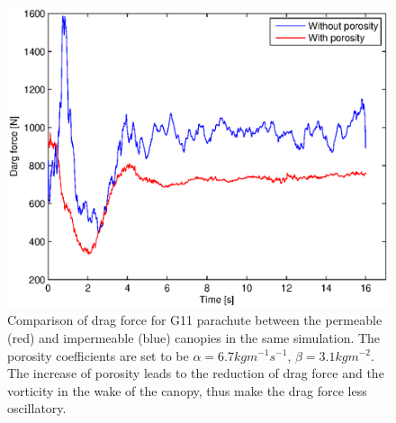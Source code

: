 \begin{figure}[H] \centering
\includegraphics[width=1.0\columnwidth]{Figures/drag_compare} 
\caption{
Comparison of drag force for G11 parachute between the permeable (red) and 
impermeable (blue) canopies in the same simulation. The porosity coefficients 
are set to be $\alpha = 6.7kgm^{-1}s^{-1}$, $\beta = 3.1kgm^{-2}$. 
The increase of porosity leads to the reduction of drag force 
and the vorticity in the wake of the canopy, thus make the drag force
less oscillatory.} 
\label{fig:compare} 
\end{figure}


